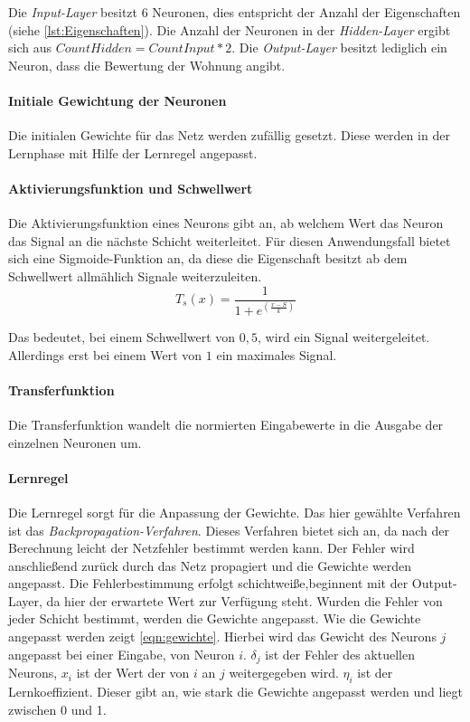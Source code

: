 Die \textit{Input-Layer} besitzt $6$ Neuronen, dies entspricht der 
Anzahl der Eigenschaften (siehe \autoref{lst:Eigenschaften}). 
Die Anzahl der Neuronen in der \textit{Hidden-Layer} ergibt sich aus 
$CountHidden = CountInput * 2$. Die \textit{Output-Layer} besitzt
lediglich ein Neuron, dass die Bewertung der Wohnung angibt. 

\paragraph{Initiale Gewichtung der Neuronen}
Die initialen Gewichte für das Netz werden zufällig gesetzt. Diese werden in der Lernphase 
mit Hilfe der Lernregel angepasst.

\paragraph{Aktivierungsfunktion und Schwellwert}
Die Aktivierungsfunktion eines Neurons gibt an, ab welchem Wert das Neuron das 
Signal an die nächste Schicht weiterleitet. 
Für diesen Anwendungsfall bietet sich eine Sigmoide-Funktion an, 
da diese die Eigenschaft besitzt ab dem Schwellwert allmählich 
Signale weiterzuleiten.\\

\begin{equation}
    T_s(x) = \frac{1}{1+e^(\frac{x-S}{k})}
\end{equation}

Das bedeutet, bei einem Schwellwert von $0,5$, wird ein Signal weitergeleitet. 
Allerdings erst bei einem Wert von $1$ ein maximales Signal. 
 

\paragraph{Transferfunktion}
Die Transferfunktion wandelt die normierten Eingabewerte in die Ausgabe der einzelnen Neuronen um.

\paragraph{Lernregel}
Die Lernregel sorgt für die Anpassung der Gewichte. Das hier gewählte 
Verfahren ist das \textit{Backpropagation-Verfahren}. 
Dieses Verfahren bietet sich an, da nach der Berechnung leicht der Netzfehler bestimmt werden kann. 
Der Fehler wird anschließend zurück durch das Netz propagiert und die Gewichte
werden angepasst. Die Fehlerbestimmung erfolgt schichtweiße,beginnent mit der Output-Layer, 
da hier der erwartete Wert zur Verfügung steht. Wurden die Fehler von jeder 
Schicht bestimmt, werden die Gewichte angepasst. 
Wie die Gewichte angepasst werden zeigt \autoref{eqn:gewichte}. 
Hierbei wird das Gewicht des Neurons $j$ angepasst bei einer Eingabe, 
von Neuron $i$.
$\delta_j$ ist der Fehler des aktuellen Neurons, $x_i$ ist der Wert der von $i$ an $j$ weitergegeben wird.
$\eta_i$ ist der Lernkoeffizient. 
Dieser gibt an, wie stark die Gewichte angepasst werden und liegt zwischen 0 und 1.

